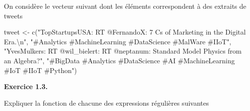 \documentclass[
]{book}
\newenvironment{Shaded}{\begin{snugshade}}{\end{snugshade}}
\newcommand{\AttributeTok}[1]{\textcolor[rgb]{0.77,0.63,0.00}{#1}}
\newcommand{\FunctionTok}[1]{\textcolor[rgb]{0.00,0.00,0.00}{#1}}
\newcommand{\NormalTok}[1]{#1}
\newcommand{\OtherTok}[1]{\textcolor[rgb]{0.56,0.35,0.01}{#1}}
\newcommand{\SpecialCharTok}[1]{\textcolor[rgb]{0.00,0.00,0.00}{#1}}
\newcommand{\StringTok}[1]{\textcolor[rgb]{0.31,0.60,0.02}{#1}}
\theoremstyle{definition}
\theoremstyle{definition}
\theoremstyle{definition}
\theoremstyle{definition}
\theoremstyle{remark}
\begin{document}
On considère le vecteur suivant dont les éléments correspondent à des extraits de tweets

\begin{Shaded}
\begin{Highlighting}[]
\NormalTok{tweet }\OtherTok{\textless{}{-}} \FunctionTok{c}\NormalTok{(}\StringTok{"TopStartupsUSA: RT @FernandoX: 7 C\textquotesingle{}s of Marketing in the Digital Era.}\SpecialCharTok{\textbackslash{}n}\StringTok{"}\NormalTok{, }
  \StringTok{"\#Analytics \#MachineLearning \#DataScience \#MalWare \#IIoT"}\NormalTok{, }
  \StringTok{"YvesMulkers: RT @wil\_bielert: RT @neptanum: Standard Model Physics from an Algebra?"}\NormalTok{, }
  \StringTok{"\#BigData \#Analytics \#DataScience \#AI \#MachineLearning \#IoT \#IIoT \#Python"}\NormalTok{)}
\end{Highlighting}
\end{Shaded}

\textbf{Exercice 1.3.}

Expliquer la fonction de chacune des expressions régulières suivantes

\begin{Shaded}
\end{Shaded}
\end{document}

